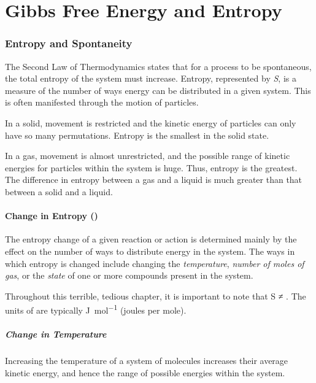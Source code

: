
\pagebreak
\part{Gibbs Free Energy and Entropy}

\section{Entropy and Spontaneity}

	The Second Law of Thermodynamics states that for a process to be spontaneous, the total entropy of the system must increase. Entropy, represented by \emph{S}, is a measure of the number of ways energy can be distributed in a given system. This is often manifested through
	the motion of particles.

	In a solid, movement is restricted and the kinetic energy of particles can only have so many permutations. Entropy is the smallest in the
	solid state.

	In a gas, movement is almost unrestricted, and the possible range of kinetic energies for particles within the system is huge. Thus,
	entropy is the greatest. The difference in entropy between a gas and a liquid is much greater than that between a solid and a liquid.


	\subsection{Change in Entropy (\entr{})}

		The entropy change of a given reaction or action is determined mainly by the effect on the number of ways to distribute energy in the
		system. The ways in which entropy is changed include changing the \emph{temperature}, \emph{number of moles of gas}, or the
		\emph{state} of one or more compounds present in the system.

		Throughout this terrible, tedious chapter, it is important to note that
		S ≠ \entr{}. The units of \entr{} are typically \si{\joule\per\mole} (joules per mole).

		\pagebreak
		\subsubsection{Change in Temperature}

			Increasing the temperature of a system of molecules increases their average kinetic energy, and hence the range of possible
			energies within the system.

